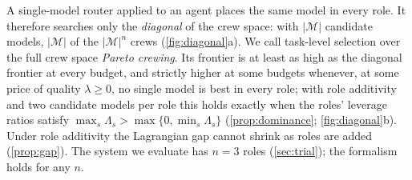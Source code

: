 \documentclass[11pt,a4paper]{article}
\theoremstyle{definition}
\theoremstyle{remark}
\theoremstyle{definition}
\newcommand{\mods}{\mathcal{M}}
\begin{document}
A single-model router applied to an agent places the same model in every role. It therefore searches only the \emph{diagonal} of the crew space: with $|\mods|$ candidate models, $|\mods|$ of the $|\mods|^n$ crews (\cref{fig:diagonal}a). We call task-level selection over the full crew space \emph{Pareto crewing}. Its frontier is at least as high as the diagonal frontier at every budget, and strictly higher at some budgets whenever, at some price of quality $\lambda\ge0$, no single model is best in every role; with role additivity and two candidate models per role this holds exactly when the roles' leverage ratios satisfy $\max_s\Lambda_s>\max\{0,\min_s\Lambda_s\}$ (\cref{prop:dominance}; \cref{fig:diagonal}b). Under role additivity the Lagrangian gap cannot shrink as roles are added (\cref{prop:gap}). The system we evaluate has $n=3$ roles (\cref{sec:trial}); the formalism holds for any $n$.
\end{document}
